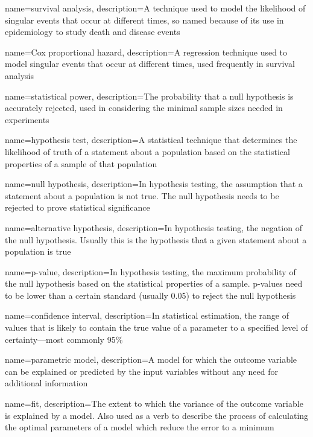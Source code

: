 {
    name={survival analysis},
    description={A technique used to model the likelihood of singular events that occur at different times, so named because of its use in epidemiology to study death and disease events}
}

{
    name={Cox proportional hazard},
    description={A regression technique used to model singular events that occur at different times, used frequently in survival analysis}
}

{
    name={statistical power},
    description={The probability that a null hypothesis is accurately rejected, used in considering the minimal sample sizes needed in experiments}
}

{
    name={hypothesis test},
    description={A statistical technique that determines the likelihood of truth of a statement about a population based on the statistical properties of a sample of that population}
}

{
    name={null hypothesis},
    description={In hypothesis testing, the assumption that a statement about a population is not true.  The null hypothesis needs to be rejected to prove statistical significance}
}

{
    name={alternative hypothesis},
    description={In hypothesis testing, the negation of the null hypothesis.  Usually this is the hypothesis that a given statement about a population is true}
}

{
    name={p-value},
    description={In hypothesis testing, the maximum probability of the null hypothesis based on the statistical properties of a sample. p-values need to be lower than a certain standard (usually 0.05) to reject the null hypothesis}
}

{
    name={confidence interval},
    description={In statistical estimation, the range of values that is likely to contain the true value of a parameter to a specified level of certainty---most commonly 95\%}
}

{
    name={parametric model},
    description={A model for which the outcome variable can be explained or predicted by the input variables without any need for additional information}
}

{
    name={fit},
    description={The extent to which the variance of the outcome variable is explained by a model.  Also used as a verb to describe the process of calculating the optimal parameters of a model which reduce the error to a minimum}
}

